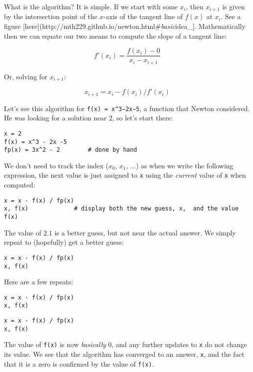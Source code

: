 \documentclass[12pt]{article}
\begin{document}
What is the algorithm? It is simple. If we start with some $x_i$, then
$x_{i+1}$ is given by the intersection point of the $x$-axis of the
tangent line of $f(x)$ at $x_i$. See a figure
{[}here{]}(http://mth229.github.io/newton.html\#\emph{basic}idea\_{]}.
Mathematically then we can equate our two means to compute the slope of
a tangent line:

\[
f'(x_i) = \frac{f(x_i) - 0}{x_i - x_{i+1}}
\]

Or, solving for $x_{i+1}$:

\[
x_{i+1} = x_i - f(x_i)/f'(x_i)
\]

Let's see this algorithm for \texttt{f(x) = x\^{}3−2x−5}, a function
that Newton considered. He was looking for a solution near $2$, so let's
start there:



\begin{verbatim}
x = 2
f(x) = x^3 - 2x -5
fp(x) = 3x^2 - 2        # done by hand
\end{verbatim}
We don't need to track the index ($x_0$, $x_1$, ...) as when we write
the following expression, the next value is just assigned to \texttt{x}
using the \emph{current} value of \texttt{x} when computed:



\begin{verbatim}
x = x - f(x) / fp(x)
x, f(x)             # display both the new guess, x,  and the value f(x)
\end{verbatim}
The value of $2.1$ is a better guess, but not near the actual answer. We
simply repeat to (hopefully) get a better guess:



\begin{verbatim}
x = x - f(x) / fp(x)
x, f(x)
\end{verbatim}
Here are a few repeats:



\begin{verbatim}
x = x - f(x) / fp(x)
x, f(x)
\end{verbatim}


\begin{verbatim}
x = x - f(x) / fp(x)
x, f(x)
\end{verbatim}
The value of \texttt{f(x)} is now \emph{basically} 0, and any further
updates to \texttt{x} do not change its value. We see that the algorithm
has converged to an answer, \texttt{x}, and the fact that it is a zero
is confirmed by the value of \texttt{f(x)}.
\end{document}
